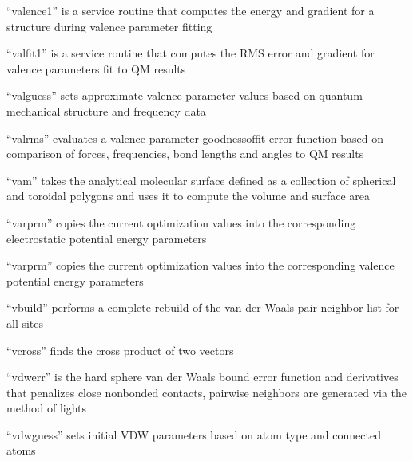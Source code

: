 \documentclass[letterpaper,11pt,english]{sphinxmanual}
\begin{document}

“valence1” is a service routine that computes the energy and
gradient for a structure during valence parameter fitting


“valfit1” is a service routine that computes the RMS error
and gradient for valence parameters fit to QM results


“valguess” sets approximate valence parameter values based on
quantum mechanical structure and frequency data


“valrms” evaluates a valence parameter goodness\sphinxhyphen{}of\sphinxhyphen{}fit error
function based on comparison of forces, frequencies, bond
lengths and angles to QM results


“vam” takes the analytical molecular surface defined
as a collection of spherical and toroidal polygons
and uses it to compute the volume and surface area


“varprm” copies the current optimization values into the
corresponding electrostatic potential energy parameters


“varprm” copies the current optimization values into the
corresponding valence potential energy parameters


“vbuild” performs a complete rebuild of the van der Waals
pair neighbor list for all sites


“vcross” finds the cross product of two vectors


“vdwerr” is the hard sphere van der Waals bound error function
and derivatives that penalizes close nonbonded contacts,
pairwise neighbors are generated via the method of lights


“vdwguess” sets initial VDW parameters based on atom type
and connected atoms
\end{document}
